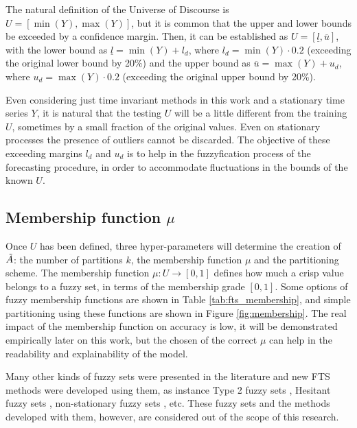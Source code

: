 The natural definition of the Universe of Discourse is $U = [\min(Y),\max(Y)]$, but it is common that the upper and lower bounds be exceeded by a confidence margin. Then, it can be established as $U = [\underline{l}, \overline{u}]$, with the lower bound as $\underline{l} = \min(Y) + l_d$, where $l_d = \min(Y)\cdot 0.2$ (exceeding the original lower bound by 20\%) and the upper bound as $\overline{u} = \max(Y) + u_d$, where $u_d = \max(Y)\cdot 0.2$ (exceeding the original upper bound by 20\%). 

Even considering just time invariant methods in this work and a stationary time series $Y$, it is natural that the testing $U$ will be a little different from the training $U$, sometimes by a small fraction of the original values. Even on stationary processes the presence of outliers cannot be discarded. The objective of these exceeding margins $l_d$ and $u_d$ is to help in the fuzzyfication process of the forecasting procedure, in order to accommodate fluctuations in the bounds of the known $U$.

%
\subsection{Membership function $\mu$}
\label{sec:fts_membership}

Once $U$ has been defined, three hyper-parameters will determine the creation of $\tilde{A}$: the number of partitions $k$, the membership function $\mu$ and the partitioning scheme. The membership function $\mu: U \rightarrow [0,1]$ defines how much a crisp value belongs to a fuzzy set, in terms of the membership grade $[0,1]$. Some options of fuzzy membership functions are shown in Table \ref{tab:fts_membership}, and simple partitioning using these functions are shown in Figure \ref{fig:membership}. The real impact of the membership function on accuracy is low, it will be demonstrated empirically later on this work, but the chosen of the correct $\mu$ can help in the readability and explainability of the model.

Many other kinds of fuzzy sets were presented in the literature and new FTS methods were developed using them, as instance Type 2 fuzzy sets \citep{huarng2005type, Bajestani2011}, Hesitant fuzzy sets \citep{Bisht2016}, non-stationary fuzzy sets \citep{Alves2018}, etc. These fuzzy sets and the methods developed with them, however, are considered out of the scope of this research.

